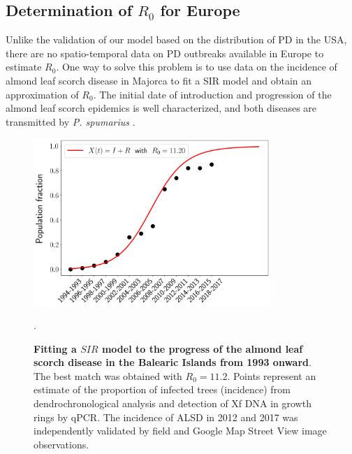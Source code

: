 \subsection{Determination of $R_0$ for Europe}\label{app:R0_Europe}

Unlike the validation of our model based on the distribution of PD in the
USA, there are no spatio-temporal data on PD outbreaks available in Europe to
estimate $R_0$. One way to solve this problem is to use data on the incidence
of almond leaf scorch disease in Majorca to fit a SIR model and obtain an
approximation of $R_0$. The initial date of introduction and progression of the
almond leaf scorch epidemics is well characterized, and both diseases are
transmitted by \textit{P. spumarius} \cite{Moralejo2019,Moralejo2020}.

\begin{figure}[H]
    \centering
    \includegraphics[width=0.8\textwidth]{Figures/R0_xylella.png}
    \caption[Fit of an SIR model to ALSD data]{\textbf{Fitting a $SIR$ model to
            the progress of the almond
            leaf scorch disease in the Balearic Islands from 1993 onward}. The
        best match
        was obtained with $R_0= 11.2$. Points represent an estimate of the
        proportion
        of infected trees (incidence) from dendrochronological analysis and
        detection
        of Xf DNA in growth rings by qPCR. The incidence of ALSD in 2012 and
        2017 was
        independently validated by field and Google Map Street View image
        observations.}.
    \label{fig:sup_R0_Europe} %
\end{figure}

